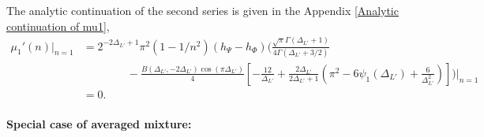 \documentclass[11pt]{article}
\newcommand{\nn}{\nonumber}
\newcommand{\lb}{\left(}
\newcommand{\rb}{\right)}
\begin{document}
The analytic continuation of the second series is given in the Appendix \ref{Analytic continuation of mu1},
\begin{align}
    \mu_1'(n)\big|_{n=1} &= 2^{-2\Delta_{L'}+1}\pi^2(1-1/n^2)(h_\Psi - h_\Phi) \Bigg(\frac{\sqrt{\pi}\Gamma(\Delta_{L'}+1)}{4\Gamma(\Delta_{L'}+3/2)} \nn  \\
    &\qquad\qquad
    -\frac{ B(\Delta_{L'},-2\Delta_{L'})\cos(\pi \Delta_{L'})}{4}\left[ -\frac{12}{\Delta_{L'}} + \frac{2\Delta_{L'} }{2\Delta_{L'} + 1} \lb \pi^2 -6\psi_1(\Delta_{L'}) + \frac{6}{\Delta_{L'}^2} \rb  \right]
    \Bigg) \Bigg|_{n=1}\\
    & = 0.
\end{align}

\paragraph{Special case of averaged mixture:}
\end{document}
